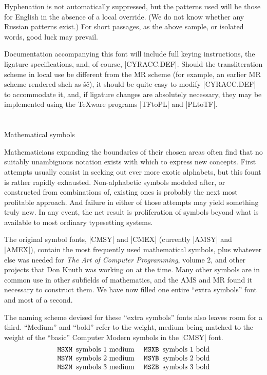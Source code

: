 \BlackBoxes

Hyphenation is not automatically suppressed, but the patterns used will
be those for English in the absence of a local override.  (We do not know
whether any Russian patterns exist.)  For short passages, as the above
sample, or isolated words, good luck may prevail.

Documentation accompanying this font will include full keying instructions,
the ligature specifications, and, of course, |CYRACC.DEF|\null.  Should the
transliteration scheme in local use be different from the MR scheme
(for example, an earlier MR scheme rendered {\cyr shch} as \v s\v c),
it should be quite easy to modify |CYRACC.DEF| to accommodate it, and,
if ligature changes are absolutely necessary, they may be implemented
using the \TeX ware programs |TFtoPL| and |PLtoTF|.

\section {} Mathematical symbols

Mathematicians expanding the boundaries of their chosen areas often
find that no suitably unambiguous notation exists with which to express
new concepts.  First attempts usually consist in seeking out ever more
exotic alphabets, but this fount is rather rapidly exhausted.
Non-alphabetic symbols modeled after, or constructed from combinations
of, existing ones is probably the next most profitable approach.  And
failure in either of those attempts may yield something truly new.
In any event, the net result is proliferation of symbols beyond
what is available to most ordinary typesetting systems.

The original symbol fonts, |CMSY| and |CMEX| (currently |AMSY| and
|AMEX|), contain the most frequently used mathematical symbols, plus
whatever else was needed for {\sl The Art of Computer Programming},
volume 2, and other projects that Don Knuth was working on at the
time.  Many other symbols are in common use in other subfields of
mathematics, and the AMS and MR found it necessary to construct them.
We have now filled one entire ``extra symbols'' font and most of a
second.

\NoBlackBoxes

The naming scheme devised for these ``extra symbols'' fonts also
leaves room for a third.  ``Medium'' and ``bold'' refer to the weight,
medium being matched to the weight of the ``basic'' Computer Modern
symbols in the |CMSY| font.
$$\vbox{\halign{#\quad&&{\tt#\unskip}\hfil\enspace&#\hfil\quad\cr
	&MSXM &	symbols 1 medium &	MSXB &	symbols 1 bold\cr
	&MSYM &	symbols 2 medium &	MSYB &	symbols 2 bold\cr
	&MSZM &	symbols 3 medium &	MSZB &	symbols 3 bold\cr
}}$$

